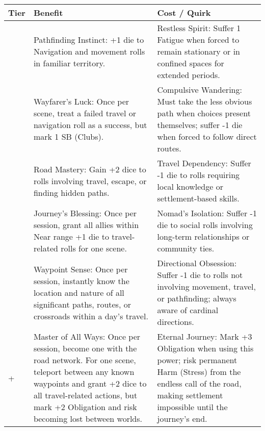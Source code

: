 \begin{longtable}{>{\raggedright\arraybackslash}p{1cm} p{5cm} p{5cm}}
\toprule
\textbf{Tier} & \textbf{Benefit} & \textbf{Cost / Quirk} \\
\midrule
1 & Pathfinding Instinct: +1 die to Navigation and movement rolls in familiar territory. & Restless Spirit: Suffer 1 Fatigue when forced to remain stationary or in confined spaces for extended periods. \\
\midrule
2 & Wayfarer's Luck: Once per scene, treat a failed travel or navigation roll as a success, but mark 1 SB (Clubs). & Compulsive Wandering: Must take the less obvious path when choices present themselves; suffer -1 die when forced to follow direct routes. \\
\midrule
3 & Road Mastery: Gain +2 dice to rolls involving travel, escape, or finding hidden paths. & Travel Dependency: Suffer -1 die to rolls requiring local knowledge or settlement-based skills. \\
\midrule
4 & Journey's Blessing: Once per session, grant all allies within Near range +1 die to travel-related rolls for one scene. & Nomad's Isolation: Suffer -1 die to social rolls involving long-term relationships or community ties. \\
\midrule
5 & Waypoint Sense: Once per session, instantly know the location and nature of all significant paths, routes, or crossroads within a day's travel. & Directional Obsession: Suffer -1 die to rolls not involving movement, travel, or pathfinding; always aware of cardinal directions. \\
\midrule
6+ & Master of All Ways: Once per session, become one with the road network. For one scene, teleport between any known waypoints and grant +2 dice to all travel-related actions, but mark +2 Obligation and risk becoming lost between worlds. & Eternal Journey: Mark +3 Obligation when using this power; risk permanent Harm (Stress) from the endless call of the road, making settlement impossible until the journey's end. \\
\bottomrule
\end{longtable}